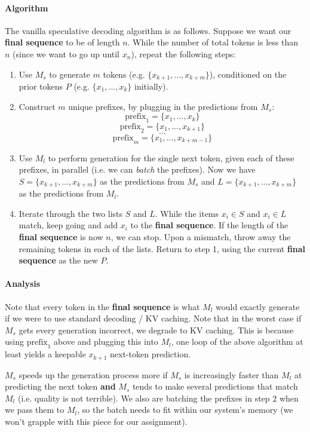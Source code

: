 \paragraph{Algorithm} The vanilla speculative decoding algorithm is as follows. Suppose we want our \textbf{final sequence} to be of length $n$. While the number of total tokens is less than $n$ (since we want to go up until $x_n$), repeat the following steps: 
\begin{enumerate}
    \item Use $M_{s}$ to generate $m$ tokens (e.g. $\{x_{k+1}, ..., x_{k+m}\}$), conditioned on the prior tokens $P$ (e.g. $\{x_1, ..., x_k\}$ initially). 
    \item Construct $m$ unique prefixes, by plugging in the predictions from $M_{s}$:
    $$\mathrm{prefix}_1 = \{x_1, ..., x_{k}\}$$
    $$\mathrm{prefix}_2 = \{x_1, ..., x_{k+1}\}$$
    $$...$$
    $$\mathrm{prefix}_m =\{x_1, ..., x_{k+m-1}\}$$
    \item Use $M_{l}$ to perform generation for the single next token, given each of these prefixes, in parallel (i.e. we can \textit{batch} the prefixes). Now we have $S = \{x_{k+1}, ..., x_{k+m}\}$ as the predictions from $M_{s}$ and $L = \{x_{k+1}, ..., x_{k+m}\}$ as the predictions from $M_{l}$. 
    \item Iterate through the two lists $S$ and $L$. While the items $x_i \in S$ and $x_i \in L$ match, keep going and add $x_i$ to the \textbf{final sequence}. If the length of the \textbf{final sequence} is now $n$, we can stop. Upon a mismatch, throw away the remaining tokens in each of the lists. Return to step 1, using the current \textbf{final sequence} as the new $P$.
\end{enumerate}

\paragraph{Analysis} Note that every token in the \textbf{final sequence} is what $M_{l}$ would exactly generate if we were to use standard decoding / KV caching. Note that in the worst case if $M_{s}$ gets every generation incorrect, we degrade to KV caching. This is because using $\mathrm{prefix}_1$ above and plugging this into $M_{l}$, one loop of the above algorithm at least yields a keepable $x_{k+1}$ next-token prediction.

$M_{s}$ speeds up the generation process more if $M_{s}$ is increasingly faster than $M_{l}$ at predicting the next token \textbf{and} $M_{s}$ tends to make several predictions that match $M_{l}$ (i.e. quality is not terrible). We also are batching the prefixes in step $2$ when we pass them to $M_{l}$, so the batch needs to fit within our system's memory (we won't grapple with this piece for our assignment).


